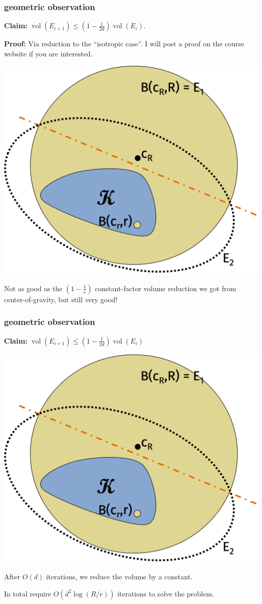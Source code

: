 \documentclass[compress]{beamer}
\DeclareMathOperator{\vol}{vol}
\begin{document}
\begin{frame}[t]
	\frametitle{geometric observation}
	\textbf{Claim:} $\vol(E_{i+1}) \leq (1-\frac{1}{2d})\vol(E_i)$.
	
	\textbf{Proof:} Via reduction to the ``isotropic case''. I will post a proof on the course website if you are interested. 
	\vspace{-.5em}
	\begin{center}
		\includegraphics[width=.5\textwidth]{ellipsoid2.png}
	\end{center}
	\vspace{-.5em}
Not as good as the $(1-\frac{1}{e})$ constant-factor volume reduction we got from center-of-gravity, but still very good! 
\end{frame}


\begin{frame}[t]
	\frametitle{geometric observation}
	\textbf{Claim:} $\vol(E_{i+1}) \leq (1-\frac{1}{2d})\vol(E_i)$

	\begin{center}
		\includegraphics[width=.5\textwidth]{ellipsoid2.png}
	\end{center}
	\begin{center}
		After $O(d)$ iterations, we reduce the volume by a constant.
		
		In total require $O(d^2\log(R/r))$ iterations to solve the problem.
	\end{center}
\end{frame}
\end{document}
